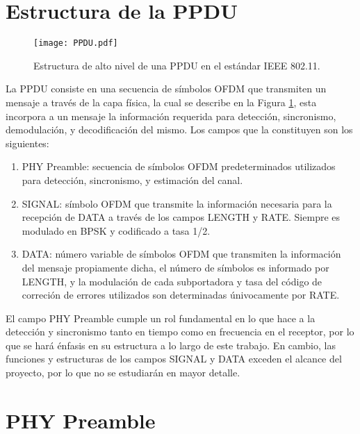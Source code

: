 \section{Estructura de la PPDU}
\label{S:ch2-ppdu}

\begin{figure}[t]
    \centering{}\texttt{[image: PPDU.pdf]}
    \caption{Estructura de alto nivel de una PPDU en el estándar IEEE 802.11.\label{fig:ppdu}}  
\end{figure}

La PPDU consiste en una secuencia de símbolos OFDM que transmiten un mensaje a través de la capa física, la cual se describe en la Figura \ref*{fig:ppdu}, esta incorpora a un mensaje la información requerida para detección, sincronismo, demodulación, y decodificación del mismo. Los campos que la constituyen son los siguientes:

\begin{enumerate}
    \item PHY Preamble: secuencia de símbolos OFDM predeterminados utilizados para detección, sincronismo, y estimación del canal.
    \item SIGNAL: símbolo OFDM que transmite la información necesaria para la recepción de DATA a través de los campos LENGTH y RATE. Siempre es modulado en BPSK y codificado a tasa 1/2.
    \item DATA: número variable de símbolos OFDM que transmiten la información del mensaje propiamente dicha, el número de símbolos es informado por LENGTH, y la modulación de cada subportadora y tasa del código de correción de errores utilizados son determinadas únivocamente por RATE.
\end{enumerate}

El campo PHY Preamble cumple un rol fundamental en lo que hace a la detección y sincronismo tanto en tiempo como en frecuencia en el receptor,  por lo que se hará énfasis en su estructura a lo largo de este trabajo. En cambio, las funciones y estructuras de los campos SIGNAL y DATA exceden el alcance del proyecto, por lo que no se estudiarán en mayor detalle.

\section{PHY Preamble}
\label{S:ch2-preambulo}

